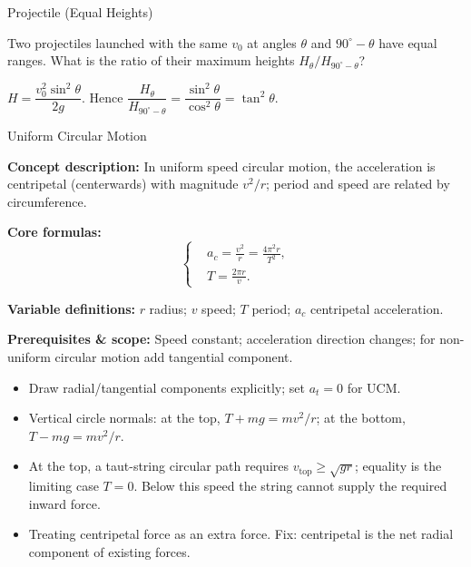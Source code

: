 \begin{KnowledgePoint}{Projectile (Equal Heights) \Core}
  \begin{cheatproblem}
  Two projectiles launched with the same $v_0$ at angles $\theta$ and $90^\circ-\theta$ have equal ranges. What is the ratio of their maximum heights $H_\theta/H_{90^\circ-\theta}$?
  \begin{solutionbox}
  $H=\dfrac{v_0^2\sin^2\theta}{2g}$. Hence $\dfrac{H_\theta}{H_{90^\circ-\theta}}=\dfrac{\sin^2\theta}{\cos^2\theta}=\tan^2\theta$.
  \end{solutionbox}
  \end{cheatproblem}
\end{KnowledgePoint}

\begin{KnowledgePoint}{Uniform Circular Motion \Core}
  \KPFormulas
  \begin{formulabox}
  \textbf{Concept description:} In uniform speed circular motion, the acceleration is centripetal (centerwards) with magnitude $v^2/r$; period and speed are related by circumference.

  \textbf{Core formulas:}
  \[
  \left\{\begin{aligned}
    &a_c=\frac{v^2}{r}=\frac{4\pi^2 r}{T^2},\\
    &T=\frac{2\pi r}{v}.
  \end{aligned}\right.
  \]

  \textbf{Variable definitions:} $r$ radius; $v$ speed; $T$ period; $a_c$ centripetal acceleration.

  \textbf{Prerequisites \& scope:} Speed constant; acceleration direction changes; for non-uniform circular motion add tangential component.
  \end{formulabox}

  \KPHeuristics
  \begin{heuristicsbox}
  \begin{itemize}[leftmargin=*]
    \item Draw radial/tangential components explicitly; set $a_t=0$ for UCM.
    \item Vertical circle normals: at the top, $T+mg=mv^2/r$; at the bottom, $T-mg=mv^2/r$.
    \item At the top, a taut-string circular path requires $v_{\text{top}}\ge \sqrt{gr}$; equality is the limiting case $T=0$. Below this speed the string cannot supply the required inward force.
  \end{itemize}
  \vspace{0.4em}
  \begin{itemize}[leftmargin=*]
    \item Treating centripetal force as an extra force. Fix: centripetal is the net radial component of existing forces.
  \end{itemize}
  \end{heuristicsbox}


\end{KnowledgePoint}
